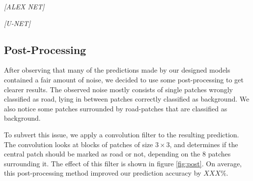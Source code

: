 \documentclass[10pt,conference,compsocconf]{IEEEtran}
\begin{document}
\textit{[ALEX NET]}

\textit{[U-NET]}



\subsection{Post-Processing} 
\label{ssec:post}

After observing that many of the predictions made by our designed models contained a fair amount of noise, we decided to use some post-processing to get clearer results. The observed noise mostly consists of single patches wrongly classified as road, lying in between patches correctly classified as background. We also notice some patches surrounded by road-patches that are classified as background.

To subvert this issue, we apply a convolution filter to the resulting prediction. The convolution looks at blocks of patches of size $3 \times 3$, and determines if the central patch should be marked as road or not, depending on the $8$ patches surrounding it. The effect of this filter is shown in figure \ref{fig:post}. On average, this post-processing method improved our prediction accuracy by $XXX\%$.
\end{document}
